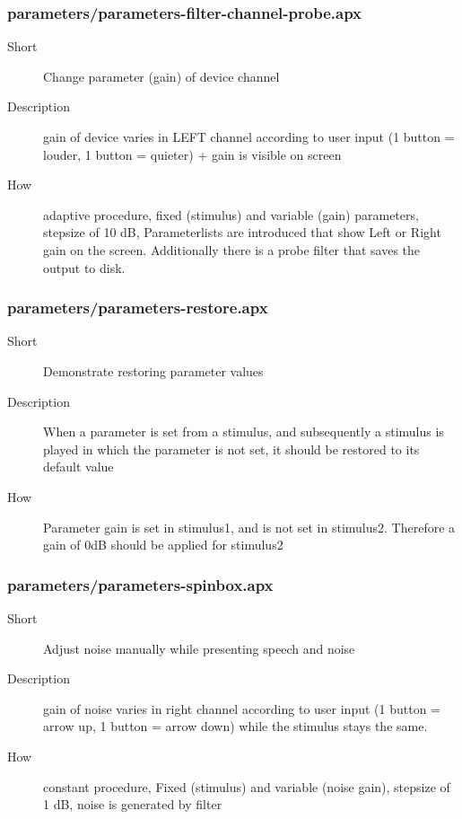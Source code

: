 \subsubsection{parameters/parameters-filter-channel-probe.apx}
\begin{description}
\item[Short] 
  Change parameter (gain) of device channel
\item[Description] 
 gain of device varies in LEFT channel according to user input (1 button = louder, 1 button = quieter) + gain is visible on screen
\item[How] 
 adaptive procedure, fixed (stimulus) and variable (gain) parameters, stepsize of 10 dB, Parameterlists are introduced that show Left or Right gain on the screen. Additionally there is a probe filter that saves the output to disk.
\end{description}

\subsubsection{parameters/parameters-restore.apx}
\begin{description}
\item[Short] 
 Demonstrate restoring parameter values
\item[Description] 
 When a parameter is set from a stimulus, and subsequently a stimulus is played in which the parameter is not set, it should be restored to its default value
\item[How] 
 Parameter gain is set in stimulus1, and is not set in stimulus2. Therefore a gain of 0dB should be applied for stimulus2
\end{description}

\subsubsection{parameters/parameters-spinbox.apx}
\begin{description}
\item[Short] 
 Adjust noise manually while presenting speech and noise
\item[Description] 
 gain of noise varies in right channel according to user input (1 button = arrow up, 1 button = arrow down) while the stimulus stays the same.
\item[How] 
 constant procedure, Fixed (stimulus) and variable (noise gain), stepsize of 1 dB, noise is generated by filter
\end{description}

